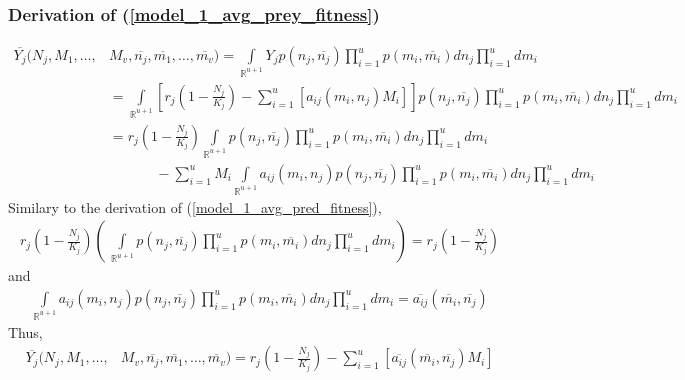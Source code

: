 \documentclass{amsart}
\theoremstyle{definition}
\theoremstyle{remark}
\numberwithin{equation}{section}
\begin{document}
\subsubsection{Derivation of (\ref{model_1_avg_prey_fitness})}
\begin{align*}
	\overline{Y_j}(N_j, M_1, \dots, &M_v, \overline{n_j}, \overline{m_1}, \dots, \overline{m_v}) = \int\limits_{\mathbb{R}^{u+1}}^{}Y_jp(n_j, \overline{n_j})\prod\limits_{i = 1}^{u}p(m_i, \overline{m_i})dn_j\prod\limits_{i = 1}^{u}dm_i \\
	&= \int\limits_{\mathbb{R}^{u+1}}\left[r_j\left(1 - \frac{N_j}{K_j}\right) - \sum\limits_{i = 1}^{u}\left[a_{ij}(m_i, n_j)M_i\right]\right]p(n_j, \overline{n_j})\prod\limits_{i = 1}^{u}p(m_i, \overline{m_i})dn_j\prod\limits_{i = 1}^{u}dm_i \\
	&= r_j\left(1 - \frac{N_j}{K_j}\right)\int\limits_{\mathbb{R}^{u+1}}p(n_j, \overline{n_j})\prod\limits_{i = 1}^{u}p(m_i, \overline{m_i})dn_j\prod\limits_{i = 1}^{u}dm_i \\
	&\ \ \ \ \ \ \ \ \ \ \ \ \ \ \ - \sum\limits_{i=1}^{u}M_i\int\limits_{\mathbb{R}^{u+1}}a_{ij}(m_i, n_j)p(n_j, \overline{n_j})\prod\limits_{i = 1}^{u}p(m_i, \overline{m_i})dn_j\prod\limits_{i = 1}^{u}dm_i
\end{align*}
Similary to the derivation of (\ref{model_1_avg_pred_fitness}),
\begin{align*}
	r_j\left(1 - \frac{N_j}{K_j}\right)\left(\ \int\limits_{\mathbb{R}^{u+1}}p(n_j, \overline{n_j})\prod\limits_{i = 1}^{u}p(m_i, \overline{m_i})dn_j\prod\limits_{i = 1}^{u}dm_i\right) = r_j\left(1 - \frac{N_j}{K_j}\right)
\end{align*}
and
\begin{align*}
	\int\limits_{\mathbb{R}^{u+1}}a_{ij}(m_i, n_j)p(n_j, \overline{n_j})\prod\limits_{i = 1}^{u}p(m_i, \overline{m_i})dn_j\prod\limits_{i = 1}^{u}dm_i = \overline{a_{ij}}(\overline{m_i}, \overline{n_j})
\end{align*}
Thus,
\begin{align*}
	\overline{Y_j}(N_j, M_1, \dots, &M_v, \overline{n_j}, \overline{m_1}, \dots, \overline{m_v}) = r_j\left(1 - \frac{N_j}{K_j}\right) - \sum\limits_{i = 1}^{u}\left[\overline{a_{ij}}(\overline{m_i}, \overline{n_j})M_i\right]
\end{align*}
\end{document}
